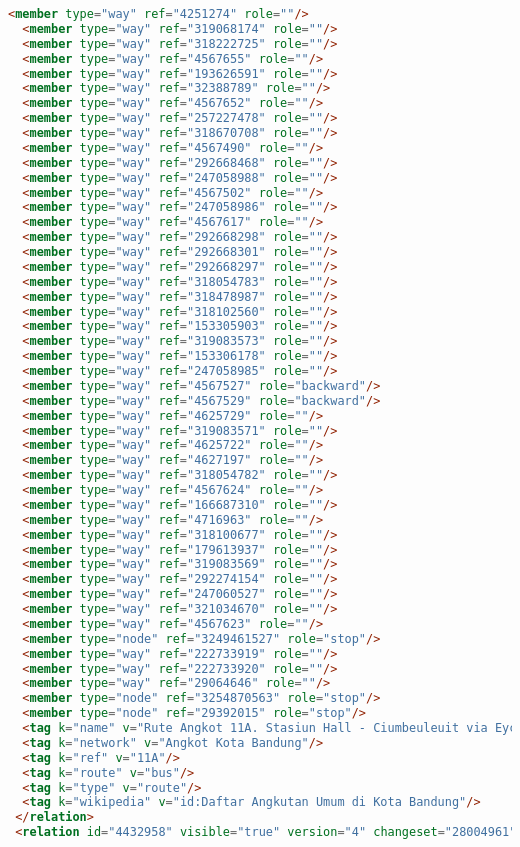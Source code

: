 \begin{lstlisting}[language=HTML,basicstyle=\tiny,caption=test.xml]
  <member type="way" ref="4251274" role=""/>
  <member type="way" ref="319068174" role=""/>
  <member type="way" ref="318222725" role=""/>
  <member type="way" ref="4567655" role=""/>
  <member type="way" ref="193626591" role=""/>
  <member type="way" ref="32388789" role=""/>
  <member type="way" ref="4567652" role=""/>
  <member type="way" ref="257227478" role=""/>
  <member type="way" ref="318670708" role=""/>
  <member type="way" ref="4567490" role=""/>
  <member type="way" ref="292668468" role=""/>
  <member type="way" ref="247058988" role=""/>
  <member type="way" ref="4567502" role=""/>
  <member type="way" ref="247058986" role=""/>
  <member type="way" ref="4567617" role=""/>
  <member type="way" ref="292668298" role=""/>
  <member type="way" ref="292668301" role=""/>
  <member type="way" ref="292668297" role=""/>
  <member type="way" ref="318054783" role=""/>
  <member type="way" ref="318478987" role=""/>
  <member type="way" ref="318102560" role=""/>
  <member type="way" ref="153305903" role=""/>
  <member type="way" ref="319083573" role=""/>
  <member type="way" ref="153306178" role=""/>
  <member type="way" ref="247058985" role=""/>
  <member type="way" ref="4567527" role="backward"/>
  <member type="way" ref="4567529" role="backward"/>
  <member type="way" ref="4625729" role=""/>
  <member type="way" ref="319083571" role=""/>
  <member type="way" ref="4625722" role=""/>
  <member type="way" ref="4627197" role=""/>
  <member type="way" ref="318054782" role=""/>
  <member type="way" ref="4567624" role=""/>
  <member type="way" ref="166687310" role=""/>
  <member type="way" ref="4716963" role=""/>
  <member type="way" ref="318100677" role=""/>
  <member type="way" ref="179613937" role=""/>
  <member type="way" ref="319083569" role=""/>
  <member type="way" ref="292274154" role=""/>
  <member type="way" ref="247060527" role=""/>
  <member type="way" ref="321034670" role=""/>
  <member type="way" ref="4567623" role=""/>
  <member type="node" ref="3249461527" role="stop"/>
  <member type="way" ref="222733919" role=""/>
  <member type="way" ref="222733920" role=""/>
  <member type="way" ref="29064646" role=""/>
  <member type="node" ref="3254870563" role="stop"/>
  <member type="node" ref="29392015" role="stop"/>
  <tag k="name" v="Rute Angkot 11A. Stasiun Hall - Ciumbeuleuit via Eyckman &quot;BELOK&quot;"/>
  <tag k="network" v="Angkot Kota Bandung"/>
  <tag k="ref" v="11A"/>
  <tag k="route" v="bus"/>
  <tag k="type" v="route"/>
  <tag k="wikipedia" v="id:Daftar Angkutan Umum di Kota Bandung"/>
 </relation>
 <relation id="4432958" visible="true" version="4" changeset="28004961" timestamp="2015-01-08T20:02:59Z" user="isonpurba" uid="2552445">

\end{lstlisting}
